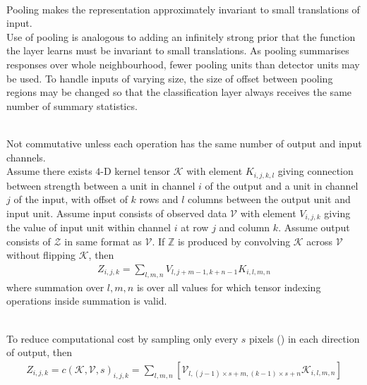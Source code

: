 \begin{remark} \\
Pooling makes the representation approximately invariant to small translations of input.\\
Use of pooling is analogous to adding an infinitely strong prior that the function the layer learns must be invariant to small translations. As pooling summarises responses over whole neighbourhood, fewer pooling units than detector units may be used. To handle inputs of varying size, the size of offset between pooling regions may be changed so that the classification layer always receives the same number of summary statistics.
\end{remark}

\begin{remark} \\
Not commutative unless each operation has the same number of output and input channels.\\
Assume there exists $4$-D kernel tensor $\mathcal{K}$ with element $K_{i,j,k,l}$ giving connection between strength between a unit in channel $i$ of the output and a unit in channel $j$ of the input, with offset of $k$ rows and $l$ columns between the output unit and input unit. Assume input consists of observed data $\mathcal{V}$ with element $V_{i,j,k}$ giving the value of input unit within channel $i$ at row $j$ and column $k$. Assume output consists of $\mathcal{Z}$ in same format as $\mathcal{V}$. If $\mathbb{Z}$ is produced by convolving $\mathcal{K}$ across $\mathcal{V}$ without flipping $\mathcal{K}$, then
\begin{align}
Z_{i,j,k} = \sum\limits_{l, m, n} V_{l, j+m-1, k+n-1} K_{i,l,m,n} \nonumber
\end{align}
where summation over $l,m,n$ is over all values for which tensor indexing operations inside summation is valid.
\end{remark}

\begin{remark} \\
To reduce computational cost by sampling only every $s$ pixels () in each direction of output, then
\begin{align}
Z_{i,j,k} = c(\mathcal{K}, \mathcal{V}, s)_{i,j,k} = \sum\limits_{l,m,n} [\mathcal{V}_{l, (j-1) \times s + m, (k-1) \times s + n} \mathcal{K}_{i,l,m,n}] \nonumber
\end{align}
\end{remark}

